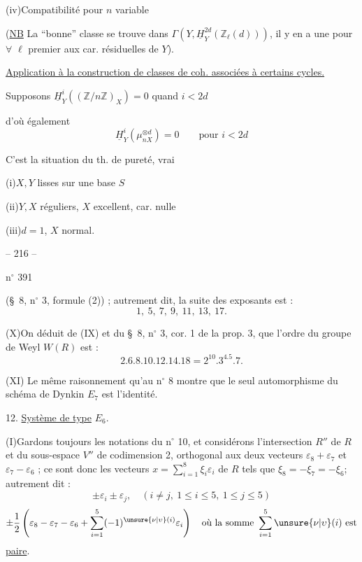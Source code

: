 \diagram{\begin{tikzcd}[row sep=small]
{}\arrow[d,Rightarrow]\\{}
\end{tikzcd}}

(iv)\quad Compatibilité pour $n$ variable

(\uline{NB} La ``bonne'' classe se trouve dans
$\Gamma(Y,\underline H_Y^{2d}(\mathbb Z_\ell(d)))$, il y en a une pour $\forall$ $\ell$
premier aux car. résiduelles de $Y$).

\uline{Application à la construction de classes de
coh. associées à certains cycles.}

Supposons $\underline H_Y^i((\mathbb Z/n\mathbb Z)_X)=0$  quand $i<2d$

d'où également
\[
\underline H_Y^i(\mu_{nX}^{\otimes d})=0\qquad\text{pour }i<2d
\]

C'est la situation du th. de pureté, vrai

(i)\quad $X,Y$ lisses sur une base $S$

(ii)\quad $Y,X$ réguliers, $X$ excellent, car. nulle

(iii)\quad $d=1$, $X$ normal.



\begin{center}-- 216 --\end{center}
\hfill n$^{\circ}$ 391

(\S\ 8, n$^{\circ}$ 3, formule (2)) ; autrement dit, la suite des exposants est :
\[
1,\ 5,\ 7,\ 9,\ 11,\ 13,\ 17.
\]

(X)\quad On déduit de (IX) et du \S\ 8, n$^{\circ}$ 3, cor. 1 de la prop. 3, que l'ordre du
groupe de Weyl $W(R)$ est :
\[
2.6.8.10.12.14.18=2^{10}.3^4.5.7.
\]

(XI) Le même raisonnement qu'au n$^{\circ}$ 8 montre que le seul automorphisme du schéma
de Dynkin $E_7$ est l'identité.

12. \uline{Système de type} $E_6$.

(I)\quad Gardons toujours les notations du n$^{\circ}$ 10, et considérons l'intersection $R''$
de $R$ et du sous-espace $V''$ de codimension 2, orthogonal aux deux vecteurs $\varepsilon_8+\varepsilon_7$
et $\varepsilon_7-\varepsilon_6$ ; ce sont donc les vecteurs $x=\sum_{i=1}^8\xi_i\varepsilon_i$ de $R$ tels que
$\xi_8=-\xi_7=-\xi_6$;
autrement dit :
\[
\pm\varepsilon_i\pm\varepsilon_j,\quad(i\ne j,\ 1\leq i\leq5,\ 1\leq j\leq5)
\]
\[
\pm\frac12\left(\varepsilon_8-\varepsilon_7-\varepsilon_6+
\sum_{i=1}^5(-1)^{\unsure{\nu|\upsilon}(i)}\varepsilon_i\right)
\quad\text{où la somme }\sum_{i=1}^5\unsure{\nu|\upsilon}(i)\text{ est}
\]
\uline{paire}.

